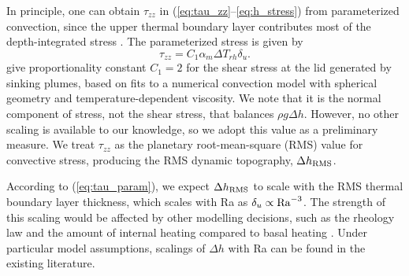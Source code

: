 In principle, one can obtain $\tau_{zz}$ in (\ref{eq:tau_zz}--\ref{eq:h_stress}) from parameterized convection, since the upper thermal boundary layer contributes most of the depth-integrated stress \citep{Parsons1983, Solomatov1995}. The parameterized stress is given by
\begin{equation}\label{eq:tau_param}
\tau_{zz} = C_1 \alpha_m \Delta T_{rh} \delta_u.
\end{equation}
\citet{Reese2005} give proportionality constant $C_1 = 2$ for the shear stress at the lid generated by sinking plumes, based on fits to a numerical convection model with spherical geometry and temperature-dependent viscosity. We note that it is the normal component of stress, not the shear stress, that balances $\rho g \Delta h$. However, no other scaling is available to our knowledge, so we adopt this value as a preliminary measure. We treat $\tau_{zz}$ as the planetary root-mean-square (RMS) value for convective stress, producing the RMS dynamic topography, $\Delta h_{\rm RMS}$. 

According to (\ref{eq:tau_param}), we expect $\Delta h_{\rm RMS}$ to scale with the RMS thermal boundary layer thickness, which scales with Ra as $\delta_u \propto {\rm Ra}^{-3}$. The strength of this scaling would be affected by other modelling decisions, such as the rheology law and the amount of internal heating compared to basal heating \citep{McKenzie1977}. Under particular model assumptions, scalings of $\Delta h$ with Ra can be found in the existing literature.

